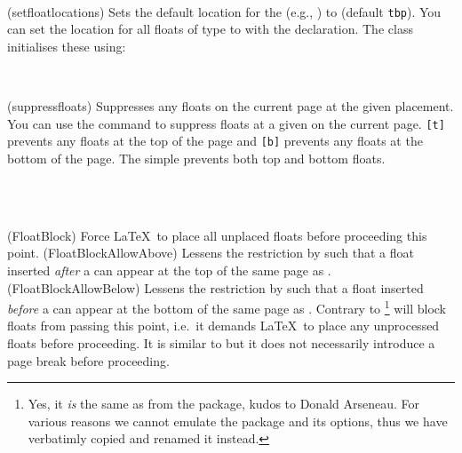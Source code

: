\begin{syntax}
\cmd{\setfloatlocations} \\
\end{syntax}
\glossary(setfloatlocations)%
  {}%
  {Sets the default location for the  (e.g., )
   to  (default \texttt{tbp}).}
You can set the location for all floats of type  to
 with the  declaration. The class
initialises these using:
\begin{lcode}
\end{lcode}

\begin{syntax}
 \cmd{\suppressfloats} \\
\end{syntax}
\glossary(suppressfloats)%
  {}%
  {Suppresses any floats on the current page at the given  placement.}
    You can use the command \cmd{\suppressfloats} to 
suppress floats
at a given  on the current page. 
\cmd{\suppressfloats}\verb?[t]? 
prevents any floats at the top of the page and 
\cmd{\suppressfloats}\verb?[b]? 
prevents any floats at the bottom of the page. 
The simple \cmd{\suppressfloats} prevents both top and bottom floats.

\begin{syntax}
  \cmd{\FloatBlock}\\
  \cmd{\FloatBlockAllowAbove}\\
  \cmd{\FloatBlockAllowBelow}
\end{syntax}
\glossary(FloatBlock)%
  {}%
  {Force \LaTeX\ to place all unplaced floats before proceeding this point.}
\glossary(FloatBlockAllowAbove)%
  {}%
  {Lessens the restriction by  such that a float
    inserted \emph{after} a  can appear at the top of
    the same page as .}
\glossary(FloatBlockAllowBelow)%
  {}%
  {Lessens the restriction by  such that a float
    inserted \emph{before} a  can appear at the bottom of
    the same page as .}
Contrary to \cmd{\suppressfloats} \cmd{\FloatBlock}\footnote{Yes, it
  \emph{is} the same as  from the
   package, kudos to Donald Arseneau. For various
  reasons we cannot emulate the  package and its
  options, thus we have verbatimly copied and renamed it instead.} will block
floats from passing this point, i.e.\ it demands \LaTeX\ to place any
unprocessed floats before proceeding. It is similar to
\cmd{\clearpage} but it does not necessarily introduce a page break
before proceeding.

